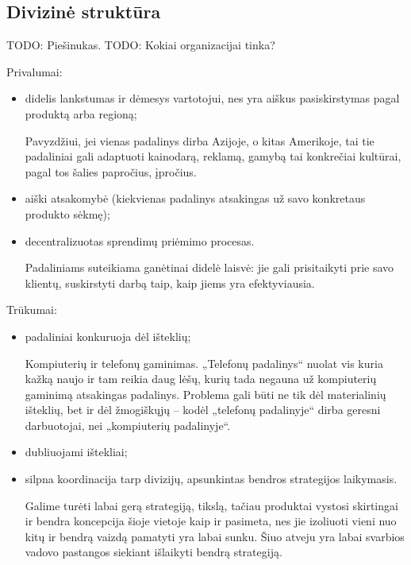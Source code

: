\subsection{Divizinė struktūra}

TODO: Piešinukas.
TODO: Kokiai organizacijai tinka?

Privalumai:
\begin{itemize}
  \item didelis lankstumas ir dėmesys vartotojui, nes yra aiškus
    pasiskirstymas pagal produktą arba regioną;
    \begin{exmp}
      Pavyzdžiui, jei vienas padalinys dirba Azijoje, o kitas Amerikoje,
      tai tie padaliniai gali adaptuoti kainodarą, reklamą, gamybą tai
      konkrečiai kultūrai, pagal tos šalies papročius, įpročius.
    \end{exmp}
  \item aiški atsakomybė (kiekvienas padalinys atsakingas už savo
    konkretaus produkto sėkmę);
  \item decentralizuotas sprendimų priėmimo procesas.
    \begin{note}
      Padaliniams suteikiama ganėtinai didelė laisvė: jie gali
      prisitaikyti prie savo klientų, suskirstyti darbą taip, kaip
      jiems yra efektyviausia.
    \end{note}
\end{itemize}

Trūkumai:
\begin{itemize}
  \item padaliniai konkuruoja dėl išteklių;
    \begin{exmp}
      Kompiuterių ir telefonų gaminimas. „Telefonų padalinys“ nuolat
      vis kuria kažką naujo ir tam reikia daug lėšų, kurių tada negauna
      už kompiuterių gaminimą atsakingas padalinys. Problema gali būti
      ne tik dėl materialinių išteklių, bet ir dėl žmogiškųjų – kodėl
      „telefonų padalinyje“ dirba geresni darbuotojai, nei „kompiuterių
      padalinyje“.
    \end{exmp}
  \item dubliuojami ištekliai;
  \item silpna koordinacija tarp divizijų, apsunkintas bendros strategijos
    laikymasis.
    \begin{note}
      Galime turėti labai gerą strategiją, tikslą, tačiau produktai
      vystosi skirtingai ir bendra koncepcija šioje vietoje kaip ir
      pasimeta, nes jie izoliuoti vieni nuo kitų ir bendrą vaizdą
      pamatyti yra labai sunku. Šiuo atveju yra labai svarbios
      vadovo pastangos siekiant išlaikyti bendrą strategiją.
    \end{note}
\end{itemize}

